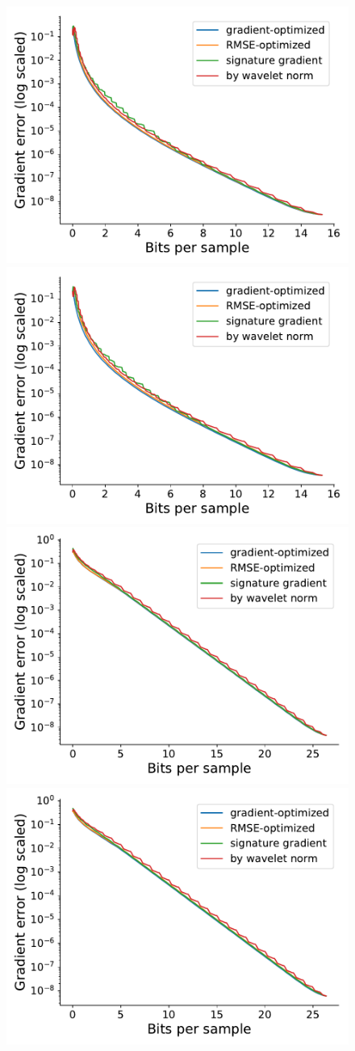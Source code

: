 \begin{figure}
	\centering
	{\includegraphics[width=0.48\linewidth]{img/gradient-laplacian/euler2d-gradient-stencil-3.pdf}}
	{\includegraphics[width=0.48\linewidth]{img/gradient-laplacian/euler2d-gradient-stencil-5.pdf}}
	{\includegraphics[width=0.48\linewidth]{img/gradient-laplacian/magnetic-gradient-stencil-3.pdf}}
	{\includegraphics[width=0.48\linewidth]{img/gradient-laplacian/magnetic-gradient-stencil-5.pdf}}

\end{figure}
